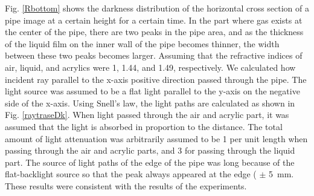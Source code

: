\documentclass[aps,pre,preprint,groupedaddress,showkeys]{revtex4-2}
\begin{document}
Fig. \ref{Rbottom} shows the darkness distribution of the horizontal cross section of a pipe image at a certain height for a certain time.
In the part where gas exists at the center of the pipe, there are two peaks in the pipe area, and as the thickness of the liquid film on the inner wall of the pipe becomes thinner, the width between these two peaks becomes larger.
Assuming that the refractive indices of air, liquid, and acrylics were 1, 1.44, and 1.49, respectively.
We calculated how incident ray parallel to the x-axis positive direction passed through the pipe.
The light source was assumed to be a flat light parallel to the y-axis on the negative side of the x-axis.
Using Snell's law, the light paths are calculated as shown in Fig. \ref{raytraseDk}.
When light passed through the air and acrylic part, it was assumed that the light is absorbed in proportion to the distance.
The total amount of light attenuation was arbitrarily assumed to be 1 per unit length when passing through the air and acrylic parts, and 3 for passing through the liquid part.
The source of light paths of the edge of the pipe was long because of the flat-backlight source so that the peak always appeared at the edge ( $\pm$ \SI{5}{mm}.
These results were consistent with the results of the experiments.
\end{document}
